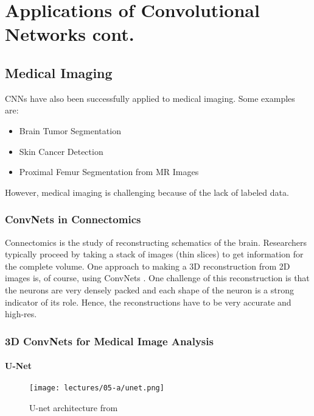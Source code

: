 \chapter{Applications of Convolutional Networks cont.}

\section{Medical Imaging}
CNNs have also been successfully applied to medical imaging. Some examples are:
\begin{itemize}
    \item Brain Tumor Segmentation \cite{braintumor2018}
    \item Skin Cancer Detection \cite{Esteva2017DermatologistlevelCO}
    \item Proximal Femur Segmentation from MR Images \cite{Deniz2018SegmentationOT}
\end{itemize}

However, medical imaging is challenging because of the lack of labeled data.

\subsection{ConvNets in Connectomics}
Connectomics is the study of reconstructing schematics of the brain. Researchers typically proceed by taking a stack of images (thin slices) to get information for the complete volume. One approach to making a 3D reconstruction from 2D images is, of course, using ConvNets \cite{jain2010}. One challenge of this reconstruction is that the neurons are very densely packed and each shape of the neuron is a strong indicator of its role. Hence, the reconstructions have to be very accurate and high-res.

\subsection{3D ConvNets for Medical Image Analysis}

\subsubsection{U-Net}
\begin{figure}[ht]
    \centering
    \texttt{[image: lectures/05-a/unet.png]}
    \caption{U-net architecture from \citep{unet}}
    \label{fig:unet}
\end{figure}


